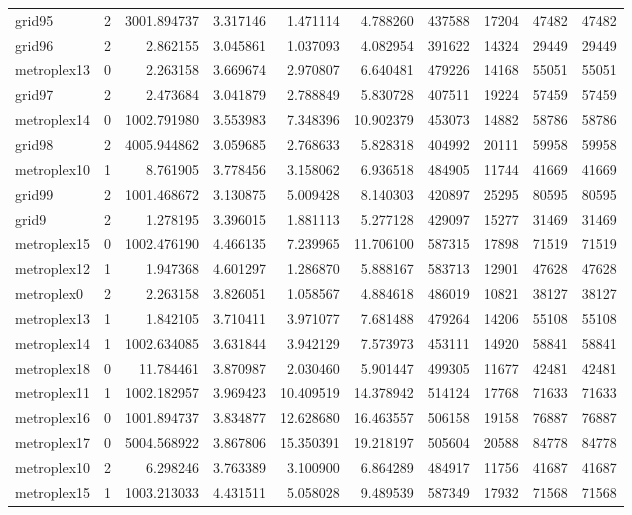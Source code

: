 \documentclass[../../../thesis.tex]{subfiles}
\begin{document}
\begin{longtable}{|l|r|r|r|r|r|r|r|r|r|}
grid95 & 2 & 3001.894737 & 3.317146 & 1.471114 & 4.788260 & 437588 & 17204 & 47482 & 47482 \\
grid96 & 2 & 2.862155 & 3.045861 & 1.037093 & 4.082954 & 391622 & 14324 & 29449 & 29449 \\
metroplex13 & 0 & 2.263158 & 3.669674 & 2.970807 & 6.640481 & 479226 & 14168 & 55051 & 55051 \\
grid97 & 2 & 2.473684 & 3.041879 & 2.788849 & 5.830728 & 407511 & 19224 & 57459 & 57459 \\
metroplex14 & 0 & 1002.791980 & 3.553983 & 7.348396 & 10.902379 & 453073 & 14882 & 58786 & 58786 \\
grid98 & 2 & 4005.944862 & 3.059685 & 2.768633 & 5.828318 & 404992 & 20111 & 59958 & 59958 \\
metroplex10 & 1 & 8.761905 & 3.778456 & 3.158062 & 6.936518 & 484905 & 11744 & 41669 & 41669 \\
grid99 & 2 & 1001.468672 & 3.130875 & 5.009428 & 8.140303 & 420897 & 25295 & 80595 & 80595 \\
grid9 & 2 & 1.278195 & 3.396015 & 1.881113 & 5.277128 & 429097 & 15277 & 31469 & 31469 \\
metroplex15 & 0 & 1002.476190 & 4.466135 & 7.239965 & 11.706100 & 587315 & 17898 & 71519 & 71519 \\
metroplex12 & 1 & 1.947368 & 4.601297 & 1.286870 & 5.888167 & 583713 & 12901 & 47628 & 47628 \\
metroplex0 & 2 & 2.263158 & 3.826051 & 1.058567 & 4.884618 & 486019 & 10821 & 38127 & 38127 \\
metroplex13 & 1 & 1.842105 & 3.710411 & 3.971077 & 7.681488 & 479264 & 14206 & 55108 & 55108 \\
metroplex14 & 1 & 1002.634085 & 3.631844 & 3.942129 & 7.573973 & 453111 & 14920 & 58841 & 58841 \\
metroplex18 & 0 & 11.784461 & 3.870987 & 2.030460 & 5.901447 & 499305 & 11677 & 42481 & 42481 \\
metroplex11 & 1 & 1002.182957 & 3.969423 & 10.409519 & 14.378942 & 514124 & 17768 & 71633 & 71633 \\
metroplex16 & 0 & 1001.894737 & 3.834877 & 12.628680 & 16.463557 & 506158 & 19158 & 76887 & 76887 \\
metroplex17 & 0 & 5004.568922 & 3.867806 & 15.350391 & 19.218197 & 505604 & 20588 & 84778 & 84778 \\
metroplex10 & 2 & 6.298246 & 3.763389 & 3.100900 & 6.864289 & 484917 & 11756 & 41687 & 41687 \\
metroplex15 & 1 & 1003.213033 & 4.431511 & 5.058028 & 9.489539 & 587349 & 17932 & 71568 & 71568 \\

\end{longtable}
\end{document}
